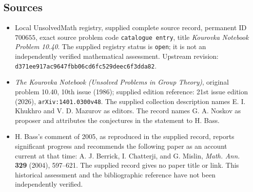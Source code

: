 \documentclass[11pt]{article}
\begin{document}
\subsection{Sources}
\begin{itemize}
\item Local UnsolvedMath registry, supplied complete source record, permanent ID \(700655\), exact source problem code \texttt{catalogue entry}, title \emph{Kourovka Notebook Problem 10.40}. The supplied registry status is \texttt{open}; it is not an independently verified mathematical assessment. Upstream revision: \texttt{d371ee917ac9647fbb06cd6fc529deec6f3dda82}.
\item \emph{The Kourovka Notebook (Unsolved Problems in Group Theory)}, original problem 10.40, 10th issue (1986); supplied edition reference: 21st issue edition (2026), \texttt{arXiv:1401.0300v48}. The supplied collection description names E. I. Khukhro and V. D. Mazurov as editors. The record names G. A. Noskov as proposer and attributes the conjectures in the statement to H. Bass.
\item H. Bass's comment of 2005, as reproduced in the supplied record, reports significant progress and recommends the following paper as an account current at that time: A. J. Berrick, I. Chatterji, and G. Mislin, \emph{Math. Ann.} \textbf{329} (2004), 597--621. The supplied record gives no paper title or link. This historical assessment and the bibliographic reference have not been independently verified.
\end{itemize}
\end{document}
